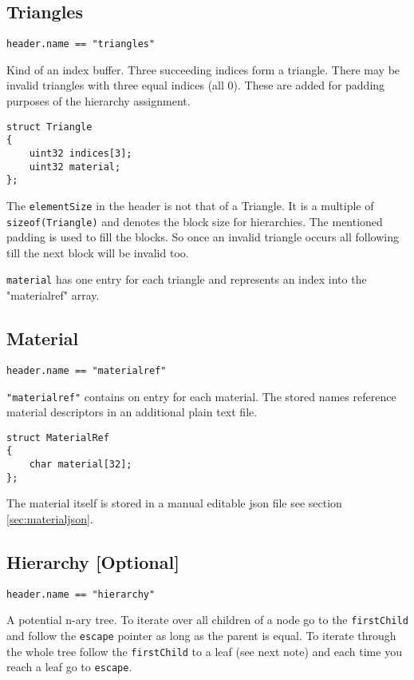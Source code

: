 \documentclass[english,10pt,a4paper,twocolumn,colorscheme=green]{orarticle}
\begin{document}
	\subsection{Triangles}
	\lstinline|header.name == "triangles"|
	
	Kind of an index buffer. Three succeeding indices form a triangle. There may be invalid triangles with three equal indices (all 0). These are added for padding purposes of the hierarchy assignment.
	\begin{lstlisting}
struct Triangle
{
	uint32 indices[3];
	uint32 material;
};
	\end{lstlisting}
	The \lstinline|elementSize| in the header is not that of a Triangle. It is a multiple of \lstinline|sizeof(Triangle)| and denotes the block size for hierarchies. The mentioned padding is used to fill the blocks. So once an invalid triangle occurs all following till the next block will be invalid too.
	
	\lstinline|material| has one entry for each triangle and represents an index into the "materialref" array.
	
	\subsection{Material}
	\lstinline|header.name == "materialref"|
	
	\lstinline|"materialref"| contains on entry for each material. The stored names reference material descriptors in an additional plain text file.
	
	\begin{lstlisting}
struct MaterialRef
{
	char material[32];
};
	\end{lstlisting}
	The material itself is stored in a manual editable json file see section \ref{sec:materialjson}.
	
	\subsection{Hierarchy [Optional]}
	\lstinline|header.name == "hierarchy"|
	
	A potential n-ary tree. To iterate over all children of a node go to the \lstinline|firstChild| and follow the \lstinline|escape| pointer as long as the parent is equal. To iterate through the whole tree follow the \lstinline|firstChild| to a leaf (see next note) and each time you reach a leaf go to \lstinline|escape|.
	
\end{document}
